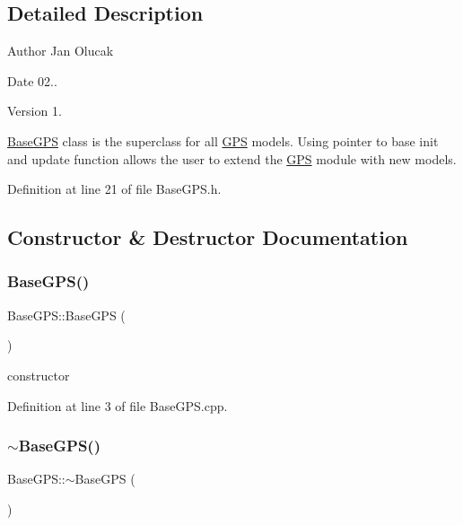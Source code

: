 \subsection{Detailed Description}
\begin{DoxyAuthor}{Author}
Jan Olucak 
\end{DoxyAuthor}
\begin{DoxyDate}{Date}
02.. 
\end{DoxyDate}
\begin{DoxyVersion}{Version}
1.
\end{DoxyVersion}
\hyperlink{class_base_g_p_s}{Base\+G\+PS} class is the superclass for all \hyperlink{class_g_p_s}{G\+PS} models. Using pointer to base init and update function allows the user to extend the \hyperlink{class_g_p_s}{G\+PS} module with new models. 

Definition at line 21 of file Base\+G\+P\+S.\+h.



\subsection{Constructor \& Destructor Documentation}
\mbox{\label{class_base_g_p_s_a224584d4b12f0663d9fb2caf996d05bb}} 
\subsubsection{\texorpdfstring{Base\+G\+P\+S()}{BaseGPS()}}
{\footnotesize\ttfamily Base\+G\+P\+S\+::\+Base\+G\+PS (\begin{DoxyParamCaption}{ }\end{DoxyParamCaption})}



constructor 



Definition at line 3 of file Base\+G\+P\+S.\+cpp.

\mbox{\label{class_base_g_p_s_aa80ae9016c4e52d7654435b122106434}} 
\subsubsection{\texorpdfstring{$\sim$\+Base\+G\+P\+S()}{~BaseGPS()}}
{\footnotesize\ttfamily Base\+G\+P\+S\+::$\sim$\+Base\+G\+PS (\begin{DoxyParamCaption}{ }\end{DoxyParamCaption})}



